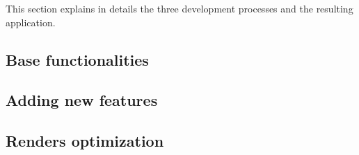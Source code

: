 This section explains in details the three development processes and the resulting application.
\subsection{Base functionalities}
\label{subsec:base_functionalities}


\subsection{Adding new features}
\label{subsec:adding_new_features}


\subsection{Renders optimization}
\label{subsec:renders_optimization}

